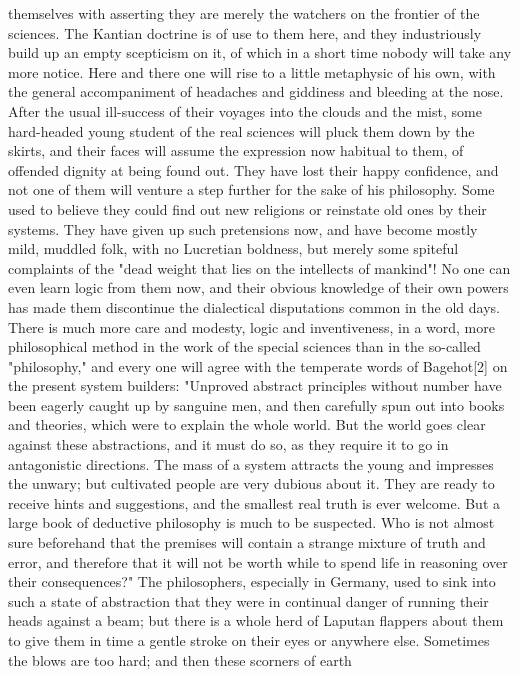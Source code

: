 themselves with asserting they are merely the watchers on the
frontier of the sciences. The Kantian doctrine is of use to them
here, and they industriously build up an empty scepticism on it, of
which in a short time nobody will take any more notice. Here and
there one will rise to a little metaphysic of his own, with the
general accompaniment of headaches and giddiness and bleeding at the
nose. After the usual ill-success of their voyages into the clouds
and the mist, some hard-headed young student of the real sciences
will pluck them down by the skirts, and their faces will assume the
expression now habitual to them, of offended dignity at being found
out. They have lost their happy confidence, and not one of them will
venture a step further for the sake of his philosophy. Some used to
believe they could find out new religions or reinstate old ones by
their systems. They have given up such pretensions now, and have
become mostly mild, muddled folk, with no Lucretian boldness, but
merely some spiteful complaints of the "dead weight that lies on the
intellects of mankind"! No one can even learn logic from them now,
and their obvious knowledge of their own powers has made them
discontinue the dialectical disputations common in the old days.
There is much more care and modesty, logic and inventiveness, in a
word, more philosophical method in the work of the special sciences
than in the so-called "philosophy," and every one will agree with the
temperate words of Bagehot[2] on the present system builders:
"Unproved abstract principles without number have been eagerly caught
up by sanguine men, and then carefully spun out into books and
theories, which were to explain the whole world. But the world goes
clear against these abstractions, and it must do so, as they require
it to go in antagonistic directions. The mass of a system attracts
the young and impresses the unwary; but cultivated people are very
dubious about it. They are ready to receive hints and suggestions,
and the smallest real truth is ever welcome. But a large book of
deductive philosophy is much to be suspected. Who is not almost sure
beforehand that the premises will contain a strange mixture of truth
and error, and therefore that it will not be worth while to spend
life in reasoning over their consequences?" The philosophers,
especially in Germany, used to sink into such a state of abstraction
that they were in continual danger of running their heads against a
beam; but there is a whole herd of Laputan flappers about them to
give them in time a gentle stroke on their eyes or anywhere else.
Sometimes the blows are too hard; and then these scorners of earth
